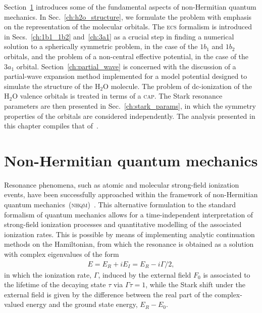 Section~\ref{ch:nonH_qm} introduces some of the fundamental aspects of
non-Hermitian quantum mechanics. In Sec.~\ref{ch:h2o_structure}, we
formulate the problem with emphasis on the representation of the
molecular orbitals. The \textsc{ecs} formalism is introduced in
Secs.~\ref{ch:1b1_1b2} and~\ref{ch:3a1} as a crucial step in finding a
numerical solution to a spherically symmetric problem, in the case of
the $1b_{1}$ and $1b_{2}$ orbitals, and the problem of a non-central
effective potential, in the case of the $3a_{1}$
orbital. Section~\ref{ch:partial_wave} is concerned with the
discussion of a partial-wave expansion method implemented for a model
potential designed to simulate the structure of the H$_{2}$O
molecule. The problem of dc-ionization of the H$_{2}$O valence
orbitals is treated in terms of a \textsc{cap}. The Stark resonance
parameters are then presented in Sec.~\ref{ch:stark_params}, in which
the symmetry properties of the orbitals are considered
independently. The analysis presented in this chapter compiles that
of~\cite{sarias_2016,sarias_2017}.


\section{Non-Hermitian quantum mechanics}
\label{ch:nonH_qm}

Resonance phenomena, such as atomic and molecular strong-field
ionization events, have been successfully approached within the
framework of non-Hermitian quantum
mechanics~(\textsc{nhqm})~\cite{Moiseyev_NHQM}. This alternative
formulation to the standard formalism of quantum mechanics allows for
a time-independent interpretation of strong-field ionization processes
and quantitative modelling of the associated ionization rates. This is
possible by means of implementing analytic continuation methods on the
Hamiltonian, from which the resonance is obtained as a solution with
complex eigenvalues of the form
%
\begin{eqnarray}
  E = E_{R} + i E_{I} = E_{R} - i \Gamma/2,
  \label{eq:complex_eigenE}
\end{eqnarray}
%
in which the ionization rate, $\Gamma$, induced by the external field
$F_{0}$ is associated to the lifetime of the decaying state $\tau$ via
$\Gamma\tau = 1$, while the Stark shift under the external field is
given by the difference between the real part of the complex-valued
energy and the ground state energy, $E_{R} - E_{0}$.

